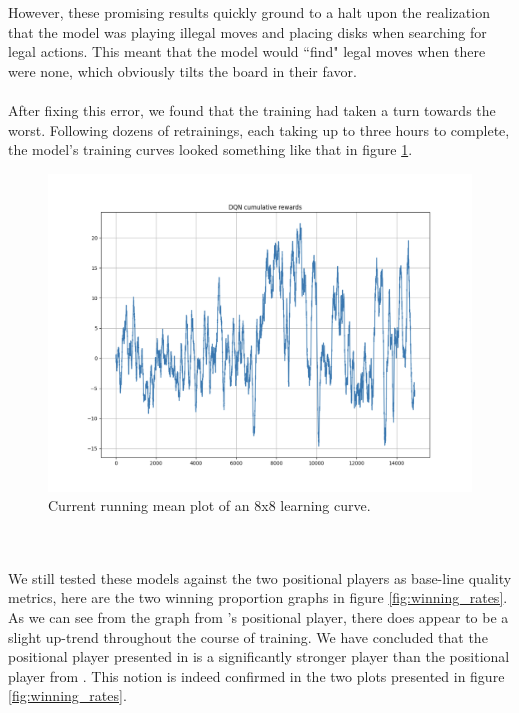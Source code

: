 \documentclass{article}
\begin{document}
\\\\
However, these promising results quickly ground to a halt upon the realization that the model was playing illegal moves and placing disks when searching for legal actions. This meant that the model would ``find" legal moves when there were none, which obviously tilts the board in their favor.
\\\\
After fixing this error, we found that the training had taken a turn towards the worst. Following dozens of retrainings, each taking up to three hours to complete, the model's training curves looked something like that in figure \ref{fig:8x8_current_curve}.
\begin{figure}[ht]
    \centering
    \includegraphics[width=0.9\linewidth]{figures/8x8_current_training_curve.png}
    \caption{\label{fig:8x8_current_curve}Current running mean plot of an 8x8 learning curve.}
\end{figure}
\\\\
We still tested these models against the two positional players as base-line quality metrics, here are the two winning proportion graphs in figure \ref{fig:winning_rates}. As we can see from the graph from \cite{codes}'s positional player, there does appear to be a slight up-trend throughout the course of training. We have concluded that the positional player presented in \cite{vanEck2008} is a significantly stronger player than the positional player from \cite{codes}. This notion is indeed confirmed in the two plots presented in figure \ref{fig:winning_rates}.
\end{document}
